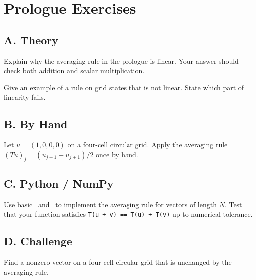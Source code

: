 \section*{Prologue Exercises}

\subsection*{A. Theory}

\begin{exercise}
Explain why the averaging rule in the prologue is linear. Your answer should
check both addition and scalar multiplication.
\end{exercise}

\begin{exercise}
Give an example of a rule on grid states that is not linear. State which part
of linearity fails.
\end{exercise}

\subsection*{B. By Hand}

\begin{exercise}
Let $u=(1,0,0,0)$ on a four-cell circular grid. Apply the averaging rule
$(Tu)_j=(u_{j-1}+u_{j+1})/2$ once by hand.
\end{exercise}

\subsection*{C. Python / NumPy}

\begin{exercise}
Use basic \Python\ and \NumPy\ to implement the averaging rule for vectors of
length $N$. Test that your function satisfies
\texttt{T(u + v) == T(u) + T(v)} up to numerical tolerance.
\end{exercise}

\subsection*{D. Challenge}

\begin{exercise}
Find a nonzero vector on a four-cell circular grid that is unchanged by the
averaging rule.
\end{exercise}
